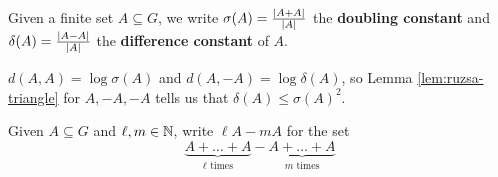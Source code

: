 \documentclass{article}
\begin{document}
\begin{ndef}
  Given a finite set $A \subseteq G$, we write $\sigma(A) = \frac{\left\lvert A + A\right\rvert}{\left\lvert A\right\rvert}$ the {\bf doubling constant} and $\delta(A) = \frac{\left\lvert A - A\right\rvert}{\left\lvert A\right\rvert}$ the {\bf difference constant} of $A$.
\end{ndef}

$d(A, A) = \log \sigma(A)$ and $d(A, -A) = \log \delta(A)$, so Lemma \ref{lem:ruzsa-triangle} for $A, -A, -A$ tells us that $\delta(A) \le \sigma(A)^2$.

\newlec

\begin{notation}
  Given $A \subseteq G$ and $\ell, m \in \mathbb N$, write $\ell A - m A$ for the set
  $$\underbrace{A + \dots + A}_{\ell \text{ times}} - \underbrace{A + \dots + A}_{m \text{ times}}$$
\end{notation}
\end{document}
